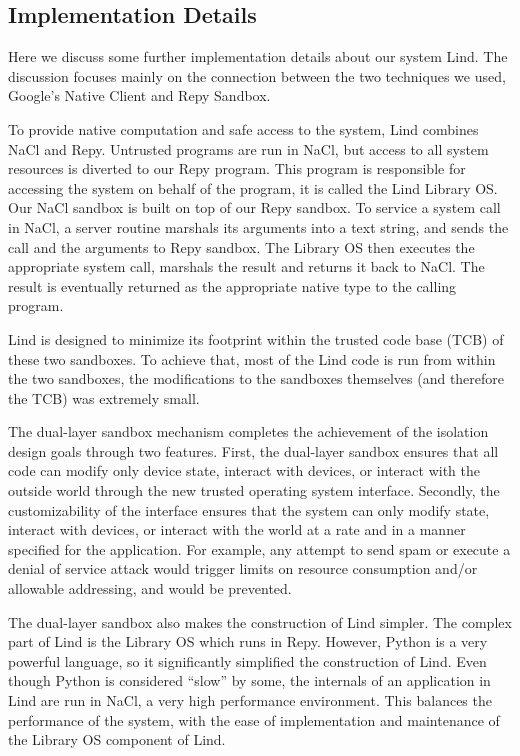 \subsection{Implementation Details}
Here we discuss some further implementation details about our system Lind. 
The discussion focuses mainly on the connection between the two techniques we used, 
Google's Native Client and Repy Sandbox. 

To provide native computation and safe access to the system, Lind combines NaCl and Repy. 
Untrusted programs are run in NaCl, but access to all system resources is diverted to our Repy program. 
This program is responsible for accessing the system on behalf of the program, it is called the Lind Library OS. 
Our NaCl sandbox is built on top of our Repy sandbox. To service a system call in NaCl, a server routine 
marshals its arguments into a text string, and sends the call and the arguments to Repy sandbox. 
The Library OS then executes the appropriate system call, marshals the result and returns it back to NaCl. 
The result is eventually returned as the appropriate native type to the calling program. 

Lind is designed to minimize its footprint within the trusted code base (TCB) of these two sandboxes. 
To achieve that, most of the Lind code is run from within the two sandboxes, the modifications to 
the sandboxes themselves (and therefore the TCB) was extremely small. 

The dual-layer sandbox mechanism completes the achievement of the isolation design goals through 
two features. First, the dual-layer sandbox ensures that all code can modify only device state, 
interact with devices, or interact with the outside world through the new trusted operating system interface. 
Secondly, the customizability of the interface ensures that the system can only modify state, interact with 
devices, or interact with the world at a rate and in a manner specified for the application. For example, 
any attempt to send spam or execute a denial of service attack would trigger limits on resource 
consumption and/or allowable addressing, and would be prevented. 

The dual-layer sandbox also makes the construction of Lind simpler. The complex part of Lind is the 
Library OS which runs in Repy. However, Python is a very powerful language, so it significantly simplified 
the construction of Lind. Even though Python is considered ``slow'' by some, the internals of 
an application in Lind are run in NaCl, a very high performance environment. 
This balances the performance of the system, with the ease of implementation and maintenance 
of the Library OS component of Lind. 

